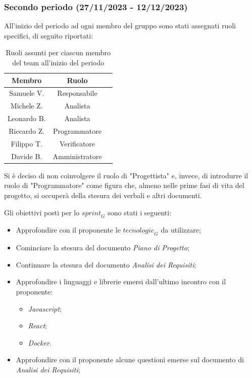 \subsubsection{Secondo periodo (27/11/2023 - 12/12/2023)}

All'inizio del periodo ad ogni membro del gruppo sono stati assegnati ruoli specifici, di seguito riportati:
\begin{table}[H]
\centering
\begin{tabular}{|c|c|c|}
\hline
\textbf{Membro} & \textbf{Ruolo} \\
\hline
Samuele V. & Responsabile \\
\hline
Michele Z. & Analista \\
\hline
Leonardo B. & Analista \\
\hline
Riccardo Z. & Programmatore \\
\hline
Filippo T. & Verificatore \\
\hline
Davide B. & Amministratore \\
\hline
\end{tabular}
\caption{Ruoli assunti per ciascun membro del team all'inizio del periodo}
\end{table}
Si è deciso di non coinvolgere il ruolo di "Progettista"  e, invece, di introdurre il ruolo di "Programmatore" come figura che, almeno nelle prime fasi di vita del progetto, si occuperà della stesura dei verbali e altri documenti.

Gli obiettivi posti per lo $\textit{sprint}_G$ sono stati i seguenti:
\begin{itemize}
    \item Approfondire con il proponente le $\textit{tecnologie}_G$ da utilizzare;
    \item Cominciare la stesura del documento \emph{Piano di Progetto};
    \item Continuare la stesura del documento \emph{Analisi dei Requisiti};
    \item Approfondire i linguaggi e librerie emersi dall'ultimo incontro con il proponente:
    \begin{itemize}
        \item \emph{Javascript};
        \item \emph{React};
        \item \emph{Docker}.
    \end{itemize}
    \item Approfondire con il proponente alcune questioni emerse sul documento di \emph{Analisi dei Requisiti};
\end{itemize}

